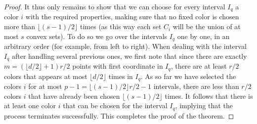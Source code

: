 \documentclass[10pt,a4paper]{amsart}
\begin{document}
\begin{proof}
It thus only remains to show that we can choose for every interval
$I_q$ a color $i$ with the required properties, making sure that no
fixed color is chosen more than $\lfloor (s-1)/2 \rfloor$ times
(as this way each set $C_i$ will be the union of at most $s$ convex 
sets). To do so we go over the intervals $I_q$ one by one, in an
arbitrary order (for example, from left to right). When dealing
with the interval $I_q$ after handling several previous ones, we
first note that since there are exactly 
$m=(\lfloor d/2 \rfloor+1)r/2$ 
points with first coordinate in $I_q$, there are at
least $r/2$ colors that appears at most 
$\lfloor d/2 \rfloor$ times in $I_q$. As so far we have selected the
colors $i$ for at most $p-1=\lfloor(s-1)/2 \rfloor r/2 -1$
intervals, there are less than $r/2$ colors $i$ that have already
been chosen $\lfloor(s-1)/2 \rfloor $ times. It follows that
there is at least one color $i$ that can be chosen for the interval
$I_q$, implying that the process terminates successfully. This
completes the proof of the theorem.
\end{proof}
\end{document}
